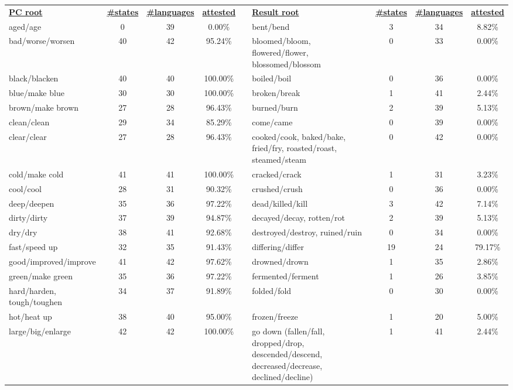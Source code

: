 \begin{tabular}{p{3cm}ccccp{3cm}ccc}
\underline{\textbf{PC root}} & \underline{\textbf{\#states}} & \underline{\textbf{\#languages}} & \underline{\textbf{attested}} & & \underline{\textbf{Result root}} & \underline{\textbf{\#states}} & \underline{\textbf{\#languages}} & \underline{\textbf{attested}} \\
aged/age & 0 & 39 & 0.00\% & & bent/bend & 3 & 34 & 8.82\% \\
bad/worse/worsen & 40 & 42 & 95.24\% & & bloomed/bloom, flowered/flower, blossomed/blossom & 0 & 33 & 0.00\% \\
black/blacken & 40 & 40 & 100.00\% & & boiled/boil & 0 & 36 & 0.00\% \\
blue/make blue & 30 & 30 & 100.00\% & & broken/break & 1 & 41 & 2.44\% \\
brown/make brown & 27 & 28 & 96.43\% & & burned/burn & 2 & 39 & 5.13\% \\
clean/clean & 29 & 34 & 85.29\% & & come/came & 0 & 39 & 0.00\% \\
clear/clear & 27 & 28 & 96.43\% & & cooked/cook, baked/bake, fried/fry, roasted/roast, steamed/steam & 0 & 42 & 0.00\% \\
cold/make cold & 41 & 41 & 100.00\% & & cracked/crack & 1 & 31 & 3.23\% \\
cool/cool & 28 & 31 & 90.32\% & & crushed/crush & 0 & 36 & 0.00\% \\
deep/deepen & 35 & 36 & 97.22\% & & dead/killed/kill & 3 & 42 & 7.14\% \\
dirty/dirty & 37 & 39 & 94.87\% & & decayed/decay, rotten/rot & 2 & 39 & 5.13\% \\
dry/dry & 38 & 41 & 92.68\% & & destroyed/destroy, ruined/ruin & 0 & 34 & 0.00\% \\
fast/speed up & 32 & 35 & 91.43\% & & differing/differ & 19 & 24 & 79.17\% \\
good/improved/improve & 41 & 42 & 97.62\% & & drowned/drown & 1 & 35 & 2.86\% \\
green/make green & 35 & 36 & 97.22\% & & fermented/ferment & 1 & 26 & 3.85\% \\
hard/harden, tough/toughen & 34 & 37 & 91.89\% & & folded/fold & 0 & 30 & 0.00\% \\
hot/heat up & 38 & 40 & 95.00\% & & frozen/freeze & 1 & 20 & 5.00\% \\
large/big/enlarge & 42 & 42 & 100.00\% & & go down (fallen/fall, dropped/drop, descended/descend, decreased/decrease, declined/decline) & 1 & 41 & 2.44\% \\

\end{tabular}
